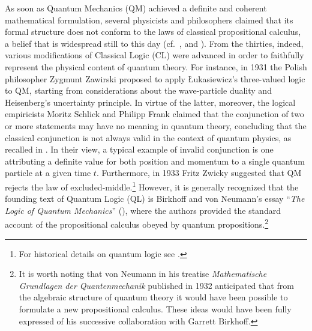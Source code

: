 \documentclass[11pt, executivepaper]{article}
\begin{document}
As soon as Quantum Mechanics (QM) achieved a definite and coherent mathematical formulation, several physicists and philosophers claimed that its formal structure does not conform to the laws of classical propositional calculus, a belief that is widespread still to this day (cf.\ \cite{Giuntini:2002}, \cite{DallaChiara:2004} and \cite{deRonde:2016}). From the thirties, indeed, various modifications of Classical Logic (CL) were advanced in order to faithfully represent the physical content of quantum theory. For instance, in 1931 the Polish philosopher Zygmunt Zawirski proposed to apply \L ukasiewicz's three-valued logic to QM, starting from considerations about the wave-particle duality and Heisenberg's uncertainty principle. In virtue of the latter, moreover, the logical empiricists Moritz Schlick and Philipp Frank claimed that the conjunction of two or more statements may have no meaning in quantum theory, concluding that the classical conjunction is not always valid in the context of quantum physics, as recalled in \cite{Carnap:1966}. In their view, a typical example of invalid conjunction is one attributing a definite value for both position and momentum to a single quantum particle at a given time $t$. Furthermore, in 1933 Fritz Zwicky suggested that QM rejects the law of excluded-middle.\footnote{For historical details on quantum logic see \cite{Jammer:1974}.} However, it is generally recognized that the founding text of Quantum Logic (QL) is Birkhoff and von Neumann's essay ``\emph{The Logic of Quantum Mechanics}'' (\cite{vonNeumann:1936}), where the authors provided the standard account of the propositional calculus obeyed by quantum propositions.\footnote{It is worth noting that von Neumann in his treatise \emph{Mathematische Grundlagen der Quantenmechanik} published in 1932 anticipated that from the algebraic structure of quantum theory it would have been possible to formulate a new propositional calculus. These ideas would have been fully expressed of his successive collaboration with Garrett Birkhoff.}
\end{document}

